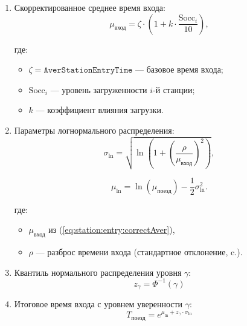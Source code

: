 \documentclass[12pt]{article}
\begin{document}
\begin{enumerate}
\item Скорректированное среднее время входа:
  \begin{equation}
    \mu_{\text{вход}} = \zeta \cdot \left(1 + k \cdot \frac{\text{Socc}_i}{10} \right),
    \label{eq:station:entry:correctAver}
  \end{equation}

  где:

  \begin{itemize} 
    \item $\zeta = \texttt{AverStationEntryTime}$ — базовое время входа;
    \item $\text{Socc}_i$ — уровень загруженности $i$-й станции;
    \item $k$ — коэффициент влияния загрузки.
  \end{itemize}

\item Параметры логнормального распределения:
  \begin{equation}
    \sigma_{\ln} = \sqrt{\ln\left(1 + \left(\frac{\rho}{\mu_{\text{вход}}} \right)^2\right)},
    \label{eq:station:entry:correctSigmaLn}
  \end{equation}

  \begin{equation}
    \mu_{\ln} = \ln(\mu_{\text{поезд}}) - \frac{1}{2} \sigma_{\ln}^2.
    \label{eq:station:entry:correctAverLn}
  \end{equation}

  где:

  \begin{itemize}
    \item $\mu_{\text{вход}}$ из (\ref{eq:station:entry:correctAver}),
    \item $\rho$ — разброс времени входа (стандартное отклонение, c.).
  \end{itemize}

\item Квантиль нормального распределения уровня $\gamma$:
  \begin{equation}
    z_\gamma = \Phi^{-1}(\gamma)
    \label{eq:station:entry:quintile}
  \end{equation}

\item Итоговое время входа с уровнем уверенности $\gamma$:
  \begin{equation}
    T_{\text{поезд}} = e^{\mu_{\ln} + z_\gamma \cdot \sigma_{\ln}}
    \label{eq:station:entry:lastReplace}
  \end{equation}

\end{enumerate}
\end{document}
